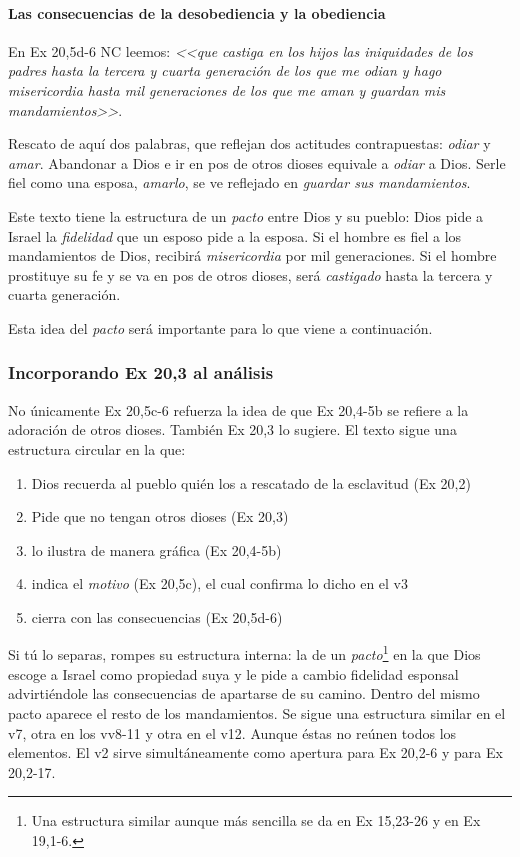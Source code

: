\documentclass{article}
\begin{document}
\paragraph{Las consecuencias de la desobediencia y la obediencia}

En Ex 20,5d-6 NC leemos: \emph{<<que castiga en los hijos las iniquidades de los padres hasta la tercera y cuarta generaci\'on de los que me odian y hago misericordia hasta mil generaciones de los que me aman y guardan mis mandamientos>>}.

Rescato de aqu\'{i} dos palabras, que reflejan dos actitudes contrapuestas: \emph{odiar} y \emph{amar}. Abandonar a Dios e ir en pos de otros dioses equivale a \emph{odiar} a Dios. Serle fiel como una esposa, \emph{amarlo}, se ve reflejado en \emph{guardar sus mandamientos}.

Este texto tiene la estructura de un \emph{pacto} entre Dios y su pueblo: Dios pide a Israel la \emph{fidelidad} que un esposo pide a la esposa. Si el hombre es fiel a los mandamientos de Dios, recibir\'a \emph{misericordia} por mil generaciones. Si el hombre prostituye su fe y se va en pos de otros dioses, ser\'a \emph{castigado} hasta la tercera y cuarta generaci\'on.

Esta idea del \emph{pacto} ser\'a importante para lo que viene a continuaci\'on.

\subsubsection{Incorporando Ex 20,3 al an\'alisis}

No \'unicamente Ex 20,5c-6 refuerza la idea de que Ex 20,4-5b se refiere a la adoraci\'on de otros dioses. Tambi\'en Ex 20,3 lo sugiere. El texto sigue una estructura circular en la que:

\begin{enumerate}
\item Dios recuerda al pueblo qui\'en los a rescatado de la esclavitud (Ex 20,2)
\item Pide que no tengan otros dioses (Ex 20,3)
\item lo ilustra de manera gr\'afica (Ex 20,4-5b)
\item indica el \emph{motivo} (Ex 20,5c), el cual confirma lo dicho en el v3
\item cierra con las consecuencias (Ex 20,5d-6)
\end{enumerate}

\noindent
Si t\'u lo separas, rompes su estructura interna: la de un \emph{pacto}\footnote{Una estructura similar aunque m\'as sencilla se da en Ex 15,23-26 y en Ex 19,1-6.} en la que Dios escoge a Israel como propiedad suya y le pide a cambio fidelidad esponsal advirti\'endole las consecuencias de apartarse de su camino. Dentro del mismo pacto aparece el resto de los mandamientos. Se sigue una estructura similar en el v7, otra en los vv8-11 y otra en el v12. Aunque \'estas no re\'unen todos los elementos. El v2 sirve simult\'aneamente como apertura para Ex 20,2-6 y para Ex 20,2-17.
\end{document}
